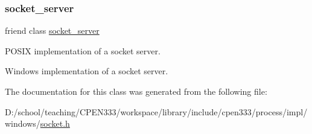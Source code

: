 \subsubsection{\texorpdfstring{socket\+\_\+server}{socket\_server}}
{\footnotesize\ttfamily friend class \hyperlink{classcpen333_1_1process_1_1windows_1_1socket__server}{socket\+\_\+server}\hspace{0.3cm}{\ttfamily [friend]}}



P\+O\+S\+IX implementation of a socket server. 

Windows implementation of a socket server. 

The documentation for this class was generated from the following file\+:\begin{DoxyCompactItemize}
\item 
D\+:/school/teaching/\+C\+P\+E\+N333/workspace/library/include/cpen333/process/impl/windows/\hyperlink{impl_2windows_2socket_8h}{socket.\+h}\end{DoxyCompactItemize}
